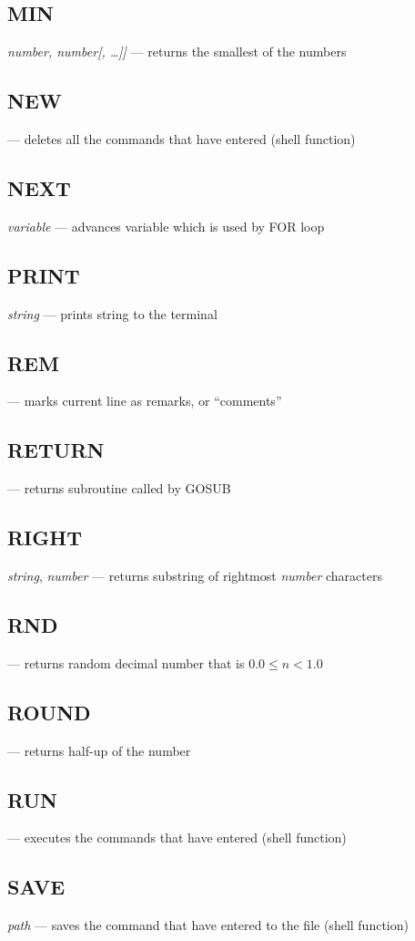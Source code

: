 \subsection{MIN} \emph{number, number[, \ldots]]} --- returns the smallest of the numbers
\subsection{NEW} --- deletes all the commands that have entered (shell function)
\subsection{NEXT} \emph{variable} --- advances variable which is used by FOR loop
\subsection{PRINT} \emph{string} --- prints string to the terminal
\subsection{REM} --- marks current line as remarks, or ``comments''
\subsection{RETURN} --- returns subroutine called by GOSUB
\subsection{RIGHT} \emph{string}, \emph{number} --- returns substring of rightmost \emph{number} characters
\subsection{RND} --- returns random decimal number that is $ 0.0 \leq n < 1.0 $
\subsection{ROUND} --- returns half-up of the number
\subsection{RUN} --- executes the commands that have entered (shell function)
\subsection{SAVE} \emph{path} --- saves the command that have entered to the file (shell function)
